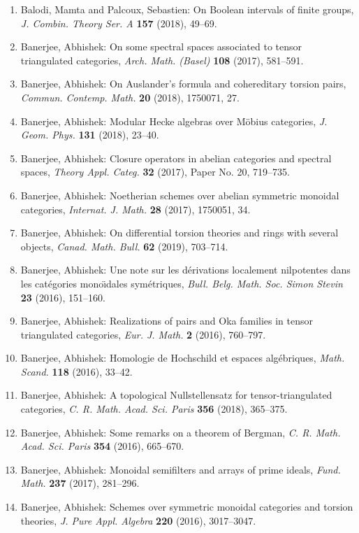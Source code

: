 \begin{enumerate}
\item Balodi, Mamta and Palcoux, Sebastien: On {B}oolean intervals of finite groups, \emph{J. Combin. Theory Ser. A} {\bf 157} (2018), 49--69.
\item Banerjee, Abhishek: On some spectral spaces associated to tensor triangulated
categories, \emph{Arch. Math. (Basel)} {\bf 108} (2017), 581--591.
\item Banerjee, Abhishek: On {A}uslander's formula and cohereditary torsion pairs, \emph{Commun. Contemp. Math.} {\bf 20} (2018), 1750071, 27.
\item Banerjee, Abhishek: Modular {H}ecke algebras over {M}\"{o}bius categories, \emph{J. Geom. Phys.} {\bf 131} (2018), 23--40.
\item Banerjee, Abhishek: Closure operators in abelian categories and spectral spaces, \emph{Theory Appl. Categ.} {\bf 32} (2017), Paper No. 20, 719--735.
\item Banerjee, Abhishek: Noetherian schemes over abelian symmetric monoidal categories, \emph{Internat. J. Math.} {\bf 28} (2017), 1750051, 34.
\item Banerjee, Abhishek: On differential torsion theories and rings with several
objects, \emph{Canad. Math. Bull.} {\bf 62} (2019), 703--714.
\item Banerjee, Abhishek: Une note sur les d\'erivations localement nilpotentes dans les
cat\'egories mono\"\i dales sym\'etriques, \emph{Bull. Belg. Math. Soc. Simon Stevin} {\bf 23} (2016), 151--160.
\item Banerjee, Abhishek: Realizations of pairs and {O}ka families in tensor
triangulated categories, \emph{Eur. J. Math.} {\bf 2} (2016), 760--797.
\item Banerjee, Abhishek: Homologie de {H}ochschild et espaces alg\'ebriques, \emph{Math. Scand.} {\bf 118} (2016), 33--42.
\item Banerjee, Abhishek: A topological {N}ullstellensatz for tensor-triangulated
categories, \emph{C. R. Math. Acad. Sci. Paris} {\bf 356} (2018), 365--375.
\item Banerjee, Abhishek: Some remarks on a theorem of {B}ergman, \emph{C. R. Math. Acad. Sci. Paris} {\bf 354} (2016), 665--670.
\item Banerjee, Abhishek: Monoidal semifilters and arrays of prime ideals, \emph{Fund. Math.} {\bf 237} (2017), 281--296.
\item Banerjee, Abhishek: Schemes over symmetric monoidal categories and torsion
theories, \emph{J. Pure Appl. Algebra} {\bf 220} (2016), 3017--3047.

\end{enumerate}
